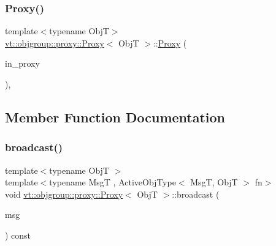 \mbox{\label{structvt_1_1objgroup_1_1proxy_1_1_proxy_ab76d59446c73ebf1cea9c80fd70fbd6b}} 
\subsubsection{\texorpdfstring{Proxy()}{Proxy()}\hspace{0.1cm}{\footnotesize\ttfamily [4/4]}}
{\footnotesize\ttfamily template$<$typename ObjT$>$ \\
\hyperlink{structvt_1_1objgroup_1_1proxy_1_1_proxy}{vt\+::objgroup\+::proxy\+::\+Proxy}$<$ ObjT $>$\+::\hyperlink{structvt_1_1objgroup_1_1proxy_1_1_proxy}{Proxy} (\begin{DoxyParamCaption}\item[{\hyperlink{namespacevt_ad7cae989df485fccca57f0792a880a8e}{Obj\+Group\+Proxy\+Type}}]{in\+\_\+proxy }\end{DoxyParamCaption})\hspace{0.3cm}{\ttfamily [inline]}, {\ttfamily [explicit]}}



\subsection{Member Function Documentation}
\mbox{\label{structvt_1_1objgroup_1_1proxy_1_1_proxy_a0b716ca776b1f06e0d7d45afbe9e5274}} 
\subsubsection{\texorpdfstring{broadcast()}{broadcast()}\hspace{0.1cm}{\footnotesize\ttfamily [1/3]}}
{\footnotesize\ttfamily template$<$typename ObjT $>$ \\
template$<$typename MsgT , Active\+Obj\+Type$<$ Msg\+T, Obj\+T $>$ fn$>$ \\
void \hyperlink{structvt_1_1objgroup_1_1proxy_1_1_proxy}{vt\+::objgroup\+::proxy\+::\+Proxy}$<$ ObjT $>$\+::broadcast (\begin{DoxyParamCaption}\item[{MsgT $\ast$}]{msg }\end{DoxyParamCaption}) const}

